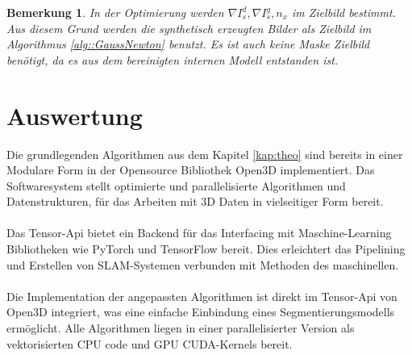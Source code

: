 \documentclass[12pt,DIV=15,BCOR=15mm,twoside,headsepline,abstract=true,listof=totoc,bibliography=totoc]{scrreprt}
\newtheorem{remark}{Bemerkung}[chapter]
\theoremstyle{remark}    %
\begin{document}
    \begin{remark}
    In der Optimierung werden $\nabla I_s^d,\nabla I_s^g, n_x$ im Zielbild bestimmt. Aus diesem Grund werden die synthetisch erzeugten Bilder als Zielbild 
    im Algorithmus \ref{alg::GaussNewton} benutzt. Es ist auch keine Maske Zielbild benötigt, da es aus dem bereinigten internen Modell entstanden ist.
    \end{remark}
    \section{Auswertung}
    Die grundlegenden Algorithmen aus dem Kapitel \ref{kap:theo} sind bereits in einer Modulare Form in der Opensource Bibliothek Open3D implementiert. Das Softwaresystem
    stellt optimierte und parallelisierte Algorithmen und Datenstrukturen, für das Arbeiten mit 3D Daten in vielseitiger Form bereit.\\\\
    Das Tensor-Api bietet ein Backend für das Interfacing mit Maschine-Learning Bibliotheken wie PyTorch und TensorFlow bereit. Dies erleichtert das Pipelining und 
    Erstellen von \ac{SLAM}-Systemen verbunden mit Methoden des maschinellen.\cite{Zhou2018}\\\\
    Die Implementation der angepassten Algorithmen ist direkt im Tensor-Api von Open3D integriert, was eine einfache Einbindung eines Segmentierungsmodells ermöglicht.
    Alle Algorithmen liegen in einer parallelisierter Version als vektorisierten CPU code und GPU CUDA-Kernels bereit.
\end{document}

